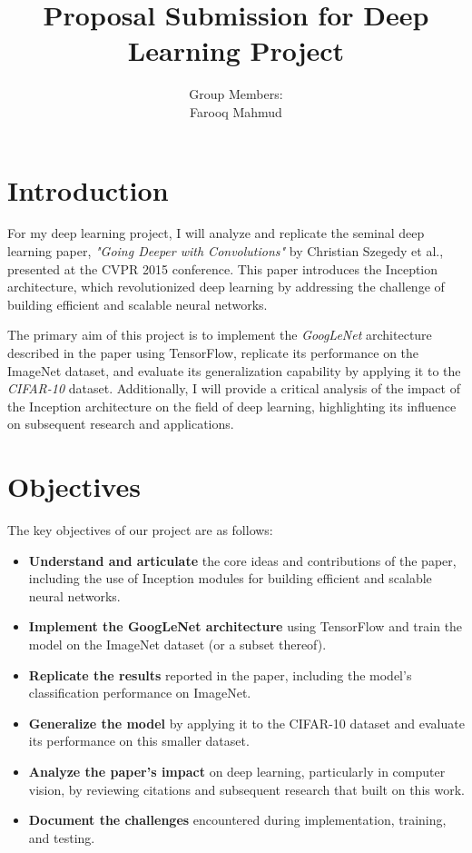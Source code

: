 \documentclass{article}
\title{Proposal Submission for Deep Learning Project}
\author{
    Group Members: \\
    Farooq Mahmud
}
\date{}
\begin{document}
\maketitle

\section{Introduction}
For my deep learning project, I will analyze and replicate the seminal deep learning paper, \textit{"Going Deeper with Convolutions"} by Christian Szegedy et al., presented at the CVPR 2015 conference. This paper introduces the Inception architecture, which revolutionized deep learning by addressing the challenge of building efficient and scalable neural networks.

The primary aim of this project is to implement the \textit{GoogLeNet} architecture described in the paper using TensorFlow, replicate its performance on the ImageNet dataset, and evaluate its generalization capability by applying it to the \textit{CIFAR-10} dataset. Additionally, I will provide a critical analysis of the impact of the Inception architecture on the field of deep learning, highlighting its influence on subsequent research and applications.

\section{Objectives}
The key objectives of our project are as follows:
\begin{itemize}
    \item \textbf{Understand and articulate} the core ideas and contributions of the paper, including the use of Inception modules for building efficient and scalable neural networks.
    \item \textbf{Implement the GoogLeNet architecture} using TensorFlow and train the model on the ImageNet dataset (or a subset thereof).
    \item \textbf{Replicate the results} reported in the paper, including the model's classification performance on ImageNet.
    \item \textbf{Generalize the model} by applying it to the CIFAR-10 dataset and evaluate its performance on this smaller dataset.
    \item \textbf{Analyze the paper's impact} on deep learning, particularly in computer vision, by reviewing citations and subsequent research that built on this work.
    \item \textbf{Document the challenges} encountered during implementation, training, and testing.
\end{itemize}
\end{document}

